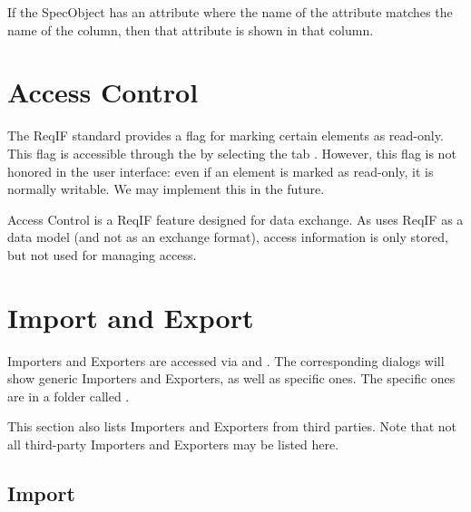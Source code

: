 If the SpecObject has an attribute where the name of the attribute
matches the name of the column, then that attribute is shown in that
column.

\section{Access Control}

The ReqIF standard provides a flag for marking certain elements as read-only.  This flag is accessible through the  by selecting the tab .  However, this flag is not honored in the user interface: even if an element is marked as read-only, it is normally writable.  We may implement this in the future.

\begin{warning}
Access Control is a ReqIF feature designed for data exchange.  As \pror{} uses ReqIF as a data model (and not as an exchange format), access information is only stored, but not used for managing access.
\end{warning}

\section{Import and Export}

Importers and Exporters are accessed via  and .  The corresponding dialogs will show generic Importers and Exporters, as well as specific ones.  The specific ones are in a folder called .

This section also lists Importers and Exporters from third parties. Note that not all third-party Importers and Exporters may be listed here.

\subsection{Import}

